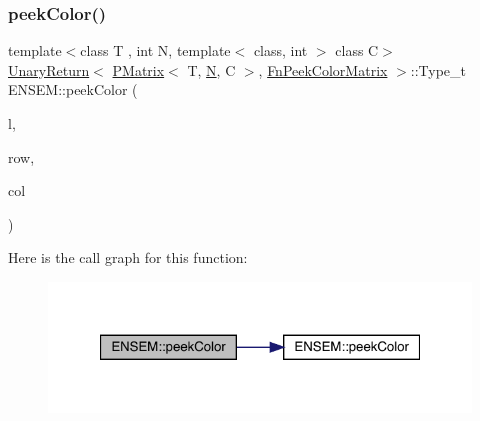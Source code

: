\subsubsection{\texorpdfstring{peekColor()}{peekColor()}\hspace{0.1cm}{\footnotesize\ttfamily [2/2]}}
{\footnotesize\ttfamily template$<$class T , int N, template$<$ class, int $>$ class C$>$ \\
\mbox{\hyperlink{structENSEM_1_1UnaryReturn}{Unary\+Return}}$<$ \mbox{\hyperlink{classENSEM_1_1PMatrix}{P\+Matrix}}$<$ T, \mbox{\hyperlink{adat__devel_2lib_2hadron_2operator__name__util_8cc_a7722c8ecbb62d99aee7ce68b1752f337}{N}}, C $>$, \mbox{\hyperlink{structENSEM_1_1FnPeekColorMatrix}{Fn\+Peek\+Color\+Matrix}} $>$\+::Type\+\_\+t E\+N\+S\+E\+M\+::peek\+Color (\begin{DoxyParamCaption}\item[{const \mbox{\hyperlink{classENSEM_1_1PMatrix}{P\+Matrix}}$<$ T, \mbox{\hyperlink{adat__devel_2lib_2hadron_2operator__name__util_8cc_a7722c8ecbb62d99aee7ce68b1752f337}{N}}, C $>$ \&}]{l,  }\item[{int}]{row,  }\item[{int}]{col }\end{DoxyParamCaption})\hspace{0.3cm}{\ttfamily [inline]}}

Here is the call graph for this function\+:\nopagebreak
\begin{figure}[H]
\begin{center}
\leavevmode
\includegraphics[width=321pt]{df/d0a/group__primmatrix_gaa9e8d0698d08d9e4b6924a14192c17b4_cgraph}
\end{center}
\end{figure}
\mbox{\label{group__primmatrix_gaf26619f85146d483d1c177abf5c2f476}} 
